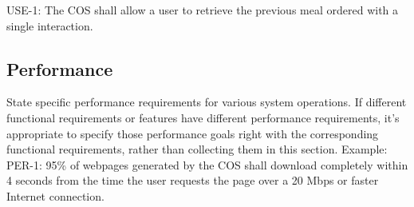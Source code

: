 USE-1: The COS shall allow a user to retrieve the previous meal ordered with a single interaction.

\subsection{Performance}
State specific performance requirements for various system operations. If different functional requirements or features have different performance requirements, it’s appropriate to specify those performance goals right with the corresponding functional requirements, rather than collecting them in this section. 
Example:\\

PER-1:	 95\% of webpages generated by the COS shall download completely within 4 seconds from the time the user requests the page over a 20 Mbps or faster Internet connection.



